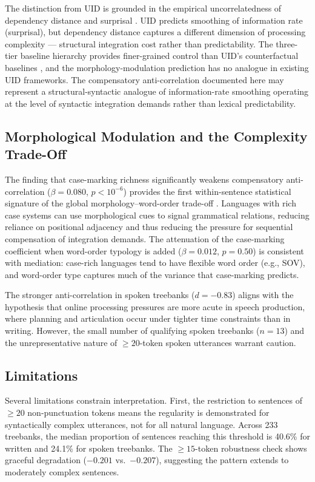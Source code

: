 \documentclass[11pt,letterpaper]{article}
\begin{document}
The distinction from UID is grounded in the empirical uncorrelatedness of dependency distance and surprisal \citep{Demberg2008}. UID predicts smoothing of information rate (surprisal), but dependency distance captures a different dimension of processing complexity --- structural integration cost rather than predictability. The three-tier baseline hierarchy provides finer-grained control than UID's counterfactual baselines \citep{Clark2023}, and the morphology-modulation prediction has no analogue in existing UID frameworks. The compensatory anti-correlation documented here may represent a structural-syntactic analogue of information-rate smoothing operating at the level of syntactic integration demands rather than lexical predictability.

\subsection{Morphological Modulation and the Complexity Trade-Off}

The finding that case-marking richness significantly weakens compensatory anti-correlation ($\beta = 0.080$, $p < 10^{-6}$) provides the first within-sentence statistical signature of the global morphology--word-order trade-off \citep{Bentz2017}. Languages with rich case systems can use morphological cues to signal grammatical relations, reducing reliance on positional adjacency and thus reducing the pressure for sequential compensation of integration demands. The attenuation of the case-marking coefficient when word-order typology is added ($\beta = 0.012$, $p = 0.50$) is consistent with mediation: case-rich languages tend to have flexible word order (e.g., SOV), and word-order type captures much of the variance that case-marking predicts.

The stronger anti-correlation in spoken treebanks ($d = -0.83$) aligns with the hypothesis that online processing pressures are more acute in speech production, where planning and articulation occur under tighter time constraints than in writing. However, the small number of qualifying spoken treebanks ($n = 13$) and the unrepresentative nature of $\geq 20$-token spoken utterances warrant caution.

\subsection{Limitations}

Several limitations constrain interpretation. First, the restriction to sentences of $\geq 20$ non-punctuation tokens means the regularity is demonstrated for syntactically complex utterances, not for all natural language. Across 233 treebanks, the median proportion of sentences reaching this threshold is 40.6\% for written and 24.1\% for spoken treebanks. The $\geq 15$-token robustness check shows graceful degradation ($-0.201$ vs.\ $-0.207$), suggesting the pattern extends to moderately complex sentences.
\end{document}
